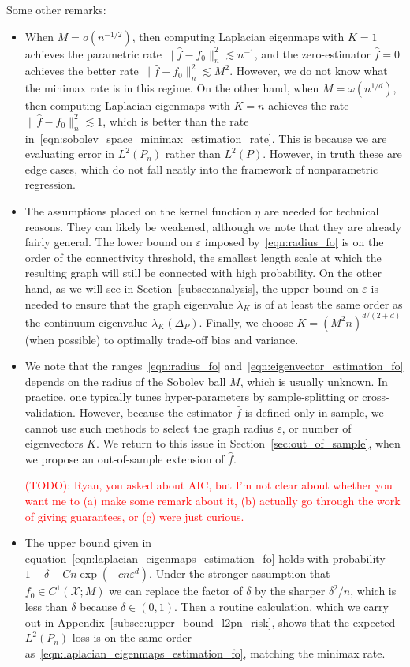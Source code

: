 \documentclass{article}
\newcommand{\1}{\mathbf{1}}
\newcommand{\mc}[1]{\mathcal{#1}}
\newcommand{\wh}[1]{\widehat{#1}}
\theoremstyle{alden}
\theoremstyle{aldenthm}
\theoremstyle{definition}
\theoremstyle{remark}
\begin{document}
Some other remarks:
\begin{itemize}
	\item When $M = o(n^{-1/2})$, then computing Laplacian eigenmaps with $K = 1$ achieves the parametric rate $\|\wh{f} - f_0\|_n^2 \lesssim n^{-1}$, and the zero-estimator $\wh{f} = 0$ achieves the better rate $\|\wh{f} - f_0\|_n^2 \lesssim M^2$. However, we do not know what the minimax rate is in this regime. On the other hand, when $M = \omega(n^{1/d})$, then computing Laplacian eigenmaps with $K = n$ achieves the rate $\|\wh{f} - f_0\|_n^2 \lesssim 1$, which is better than the rate in~\eqref{eqn:sobolev_space_minimax_estimation_rate}. This is because we are evaluating error in $L^2(P_n)$ rather than $L^2(P)$. However, in truth these are edge cases, which do not fall neatly into the framework of nonparametric regression. 
	\item The assumptions placed on the kernel function $\eta$ are needed for technical reasons. They can likely be weakened, although we note that they are already fairly general. The lower bound on $\varepsilon$ imposed by~\eqref{eqn:radius_fo} is on the order of the connectivity threshold, the smallest length scale at which the resulting graph will still be connected with high probability. On the other hand, as we will see in Section~\ref{subsec:analysis}, the upper bound on $\varepsilon$ is needed to ensure that the graph eigenvalue $\lambda_K$ is of at least the same order as the continuum eigenvalue $\lambda_K(\Delta_P)$. Finally, we choose $K = (M^2n)^{d/(2 + d)}$ (when possible) to optimally trade-off bias and variance.
	\item We note that the ranges~\eqref{eqn:radius_fo} and~\eqref{eqn:eigenvector_estimation_fo} depends on the radius of the Sobolev ball $M$, which is usually unknown. In practice, one typically tunes hyper-parameters by sample-splitting or cross-validation. However, because the estimator $\wh{f}$ is defined only in-sample, we cannot use such methods to select the graph radius $\varepsilon$, or number of eigenvectors $K$. We return to this issue in Section~\ref{sec:out_of_sample}, when we propose an out-of-sample extension of $\wh{f}$. 
	
	\textcolor{red}{(TODO): Ryan, you asked about AIC, but I'm not clear about whether you want me to (a) make some remark about it, (b) actually go through the work of giving guarantees, or (c) were just curious.}
	
	\item The upper bound given in equation~\eqref{eqn:laplacian_eigenmaps_estimation_fo} holds with probability $1 - \delta - Cn\exp(-cn\varepsilon^d)$. Under the stronger assumption that $f_0 \in C^1(\mc{X};M)$ we can replace the factor of $\delta$ by the sharper $\delta^2/n$, which is less than $\delta$ because $\delta \in (0,1)$. Then a routine calculation, which we carry out in Appendix~\ref{subsec:upper_bound_l2pn_risk}, shows that the expected $L^2(P_n)$ loss is on the same order as~\eqref{eqn:laplacian_eigenmaps_estimation_fo}, matching the minimax rate.
\end{itemize}
\end{document}
